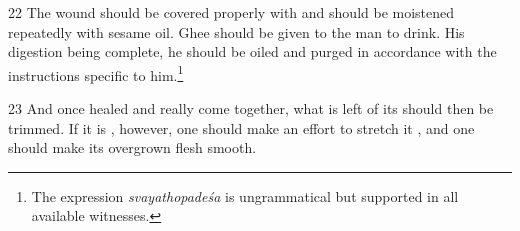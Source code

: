 \begin{translation}
    \item[22] 
    The wound should be covered properly with  and should be
    moistened repeatedly with sesame oil.  Ghee should be given to the man to
    drink.  His digestion being complete, he should be oiled and purged in
    accordance with the instructions specific to him.\footnote{The expression 
    \emph{svayathopadeśa} is ungrammatical but supported in all available 
    witnesses.}   
    
    \item[23] %
    And once healed and really come together, what is left of its 
    should then be trimmed. If it is  , however, one should make an
    effort to stretch it , and one should make its overgrown flesh smooth.
    
    
\end{translation}    
